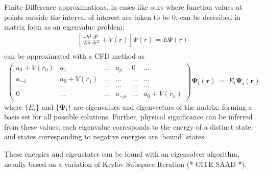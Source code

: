 Finite Difference approximations, in cases like ours where function values at points outside the interval of interest are taken to be $0$, can be described in matrix form as an eigenvalue problem; 
\begin{align*}
    \left[\frac{-\hbar^{2}}{2m}\frac{d^2}{dr^2} + V\left(r\right)\right] \Psi\left(r\right) = E\Psi\left(r\right)\\
\end{align*}
can be approximated with a CFD method as
\begin{align*}
    \begin{pmatrix}
        a_{0}+V\left(r_{0}\right)&a_{1}&...&a_{p}&0&...\\
        a_{-1}&a_{0}+V\left(r_{1}\right)&...&...&...&...\\
        ...&...&...&...&...&...\\
        0&...&...&a_{-p}&...&a_{0}+V\left(r_{n}\right)
    \end{pmatrix}\mathbf{\Psi_{i}\left(r\right)}\ =\ E_{i}\mathbf{\Psi_{i}\left(r\right)}.
\end{align*}
where $\{E_{i}\}$ and $\{\mathbf{\Psi_{i}}\}$ are eigenvalues and eigenvectors of the matrix; forming a basis set for all possible solutions. Further, physical significance can be inferred from these values; each eigenvalue corresponds to the energy of a distinct state, and states corresponding to negative energies are `bound' states.

These energies and eigenstates can be found with an eigensolver algorithm, usually based on a variation of Krylov Subspace Iteration (* CITE SAAD *). 

